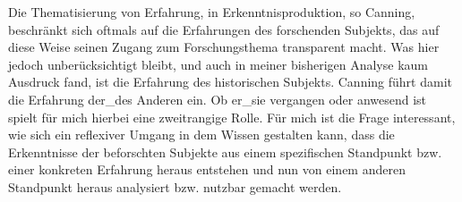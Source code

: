  Die Thematisierung von
Erfahrung, in Erkenntnisproduktion, so Canning, beschränkt sich oftmals auf
die Erfahrungen des forschenden Subjekts, das auf diese Weise seinen Zugang zum
Forschungsthema transparent macht. Was hier jedoch unberücksichtigt bleibt, und
auch in meiner bisherigen Analyse kaum Ausdruck fand, ist die Erfahrung des
historischen Subjekts. Canning führt damit die Erfahrung der\_des Anderen ein.
Ob er\_sie vergangen oder anwesend ist spielt für mich hierbei eine zweitrangige
Rolle. Für mich ist die Frage interessant, wie sich ein reflexiver Umgang in
dem Wissen gestalten kann, dass die Erkenntnisse der beforschten Subjekte aus
einem spezifischen Standpunkt bzw. einer konkreten Erfahrung heraus entstehen
und nun von einem anderen Standpunkt heraus analysiert bzw. nutzbar gemacht
werden.\\

